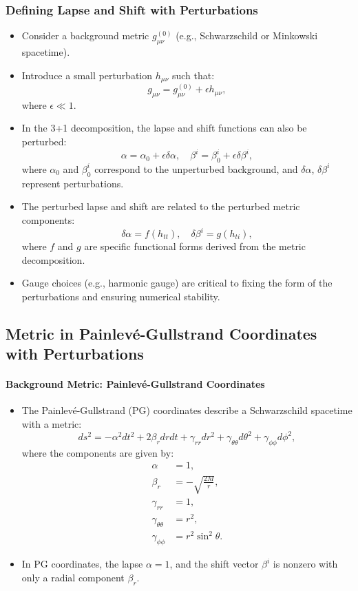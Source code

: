 \documentclass[12pt]{article}
\begin{document}
\subsubsection{Defining Lapse and Shift with Perturbations}
\begin{itemize}
    \item Consider a background metric $g_{\mu\nu}^{(0)}$ (e.g., Schwarzschild or Minkowski spacetime).
    \item Introduce a small perturbation $h_{\mu\nu}$ such that:
    \[
    g_{\mu\nu} = g_{\mu\nu}^{(0)} + \epsilon h_{\mu\nu},
    \]
    where $\epsilon \ll 1$.
    \item In the 3+1 decomposition, the lapse and shift functions can also be perturbed:
    \[
    \alpha = \alpha_0 + \epsilon \delta\alpha, \quad
    \beta^i = \beta_0^i + \epsilon \delta\beta^i,
    \]
    where $\alpha_0$ and $\beta_0^i$ correspond to the unperturbed background, and $\delta\alpha$, $\delta\beta^i$ represent perturbations.
    \item The perturbed lapse and shift are related to the perturbed metric components:
    \[
    \delta\alpha = f(h_{tt}), \quad \delta\beta^i = g(h_{ti}),
    \]
    where $f$ and $g$ are specific functional forms derived from the metric decomposition.
    \item Gauge choices (e.g., harmonic gauge) are critical to fixing the form of the perturbations and ensuring numerical stability.
\end{itemize}

\subsection{Metric in Painlevé-Gullstrand Coordinates with Perturbations}

\paragraph{Background Metric: Painlevé-Gullstrand Coordinates}
\begin{itemize}
    \item The Painlevé-Gullstrand (PG) coordinates describe a Schwarzschild spacetime with a metric:
    \[
    ds^2 = -\alpha^2 dt^2 + 2\beta_r dr dt + \gamma_{rr} dr^2 + \gamma_{\theta\theta} d\theta^2 + \gamma_{\phi\phi} d\phi^2,
    \]
    where the components are given by:
    \begin{align*}
        \alpha &= 1, \\
        \beta_r &= -\sqrt{\frac{2M}{r}}, \\
        \gamma_{rr} &= 1, \\
        \gamma_{\theta\theta} &= r^2, \\
        \gamma_{\phi\phi} &= r^2 \sin^2\theta.
    \end{align*}
    \item In PG coordinates, the lapse $\alpha = 1$, and the shift vector $\beta^i$ is nonzero with only a radial component $\beta_r$.
\end{itemize}
\end{document}
